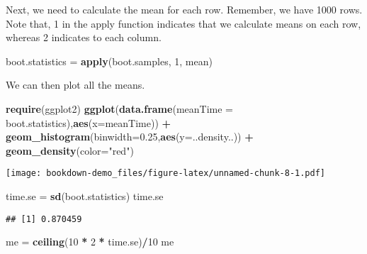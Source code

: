 \documentclass[]{book}
\newenvironment{Shaded}{\begin{snugshade}}{\end{snugshade}}
\newcommand{\DataTypeTok}[1]{\textcolor[rgb]{0.13,0.29,0.53}{#1}}
\newcommand{\DecValTok}[1]{\textcolor[rgb]{0.00,0.00,0.81}{#1}}
\newcommand{\FloatTok}[1]{\textcolor[rgb]{0.00,0.00,0.81}{#1}}
\newcommand{\KeywordTok}[1]{\textcolor[rgb]{0.13,0.29,0.53}{\textbf{#1}}}
\newcommand{\NormalTok}[1]{#1}
\newcommand{\OperatorTok}[1]{\textcolor[rgb]{0.81,0.36,0.00}{\textbf{#1}}}
\newcommand{\StringTok}[1]{\textcolor[rgb]{0.31,0.60,0.02}{#1}}
\begin{document}
Next, we need to calculate the mean for each row. Remember, we have 1000 rows. Note that, 1 in the apply function indicates that we calculate means on each row, whereas 2 indicates to each column.

\begin{Shaded}
\begin{Highlighting}[]
\NormalTok{boot.statistics =}\StringTok{ }\KeywordTok{apply}\NormalTok{(boot.samples, }\DecValTok{1}\NormalTok{, mean)}
\end{Highlighting}
\end{Shaded}

We can then plot all the means.

\begin{Shaded}
\begin{Highlighting}[]
\KeywordTok{require}\NormalTok{(ggplot2)}
\KeywordTok{ggplot}\NormalTok{(}\KeywordTok{data.frame}\NormalTok{(}\DataTypeTok{meanTime =}\NormalTok{ boot.statistics),}\KeywordTok{aes}\NormalTok{(}\DataTypeTok{x=}\NormalTok{meanTime)) }\OperatorTok{+}
\KeywordTok{geom_histogram}\NormalTok{(}\DataTypeTok{binwidth=}\FloatTok{0.25}\NormalTok{,}\KeywordTok{aes}\NormalTok{(}\DataTypeTok{y=}\NormalTok{..density..)) }\OperatorTok{+}
\KeywordTok{geom_density}\NormalTok{(}\DataTypeTok{color=}\StringTok{"red"}\NormalTok{)}
\end{Highlighting}
\end{Shaded}

\texttt{[image: bookdown-demo\_files/figure-latex/unnamed-chunk-8-1.pdf]}

\begin{Shaded}
\begin{Highlighting}[]
\NormalTok{time.se =}\StringTok{ }\KeywordTok{sd}\NormalTok{(boot.statistics)}
\NormalTok{time.se}
\end{Highlighting}
\end{Shaded}

\begin{verbatim}
## [1] 0.870459
\end{verbatim}

\begin{Shaded}
\begin{Highlighting}[]
\NormalTok{me =}\StringTok{ }\KeywordTok{ceiling}\NormalTok{(}\DecValTok{10} \OperatorTok{*}\StringTok{ }\DecValTok{2} \OperatorTok{*}\StringTok{ }\NormalTok{time.se)}\OperatorTok{/}\DecValTok{10}
\NormalTok{me}
\end{Highlighting}
\end{Shaded}
\end{document}
